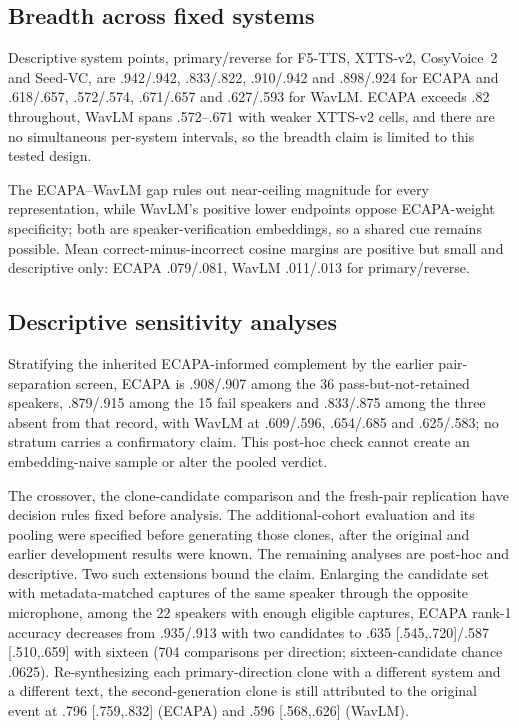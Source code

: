 \documentclass[10pt,twocolumn,letterpaper]{article}
\begin{document}
\subsection{Breadth across fixed systems}
Descriptive system points, primary/reverse for F5-TTS, XTTS-v2, CosyVoice~2
and Seed-VC, are .942/.942, .833/.822, .910/.942 and .898/.924 for ECAPA and
.618/.657, .572/.574, .671/.657 and .627/.593 for WavLM. ECAPA exceeds .82
throughout, WavLM spans .572--.671 with weaker XTTS-v2 cells, and there are no
simultaneous per-system intervals, so the breadth claim is limited to this
tested design.

The ECAPA--WavLM gap rules out near-ceiling magnitude for every representation,
while WavLM's positive lower endpoints oppose ECAPA-weight specificity; both
are speaker-verification embeddings, so a shared cue remains possible. Mean
correct-minus-incorrect cosine margins are positive but small and descriptive
only: ECAPA .079/.081, WavLM .011/.013 for primary/reverse.

\subsection{Descriptive sensitivity analyses}
Stratifying the inherited ECAPA-informed complement by the earlier
pair-separation screen, ECAPA is .908/.907 among the 36 pass-but-not-retained
speakers, .879/.915 among the 15 fail speakers and .833/.875 among the three
absent from that record, with WavLM at .609/.596, .654/.685 and .625/.583; no
stratum carries a confirmatory claim. This post-hoc check cannot create an
embedding-naive sample or alter the pooled verdict.

The crossover, the clone-candidate comparison and the fresh-pair replication
have decision rules fixed before analysis. The additional-cohort
evaluation and its pooling were specified before generating those clones, after
the original and earlier development results were known. The remaining analyses
are post-hoc and descriptive. Two such
extensions bound the claim. Enlarging the candidate set with
metadata-matched captures of the same speaker through the opposite microphone,
among the 22 speakers with enough eligible captures, ECAPA rank-1 accuracy
decreases from .935/.913 with two candidates to .635 [.545,.720]/.587
[.510,.659] with sixteen (704 comparisons per direction; sixteen-candidate
chance .0625). Re-synthesizing each primary-direction clone with a
different system and a different text, the second-generation clone is still
attributed to the original event at .796 [.759,.832] (ECAPA) and .596
[.568,.626] (WavLM).
\end{document}
